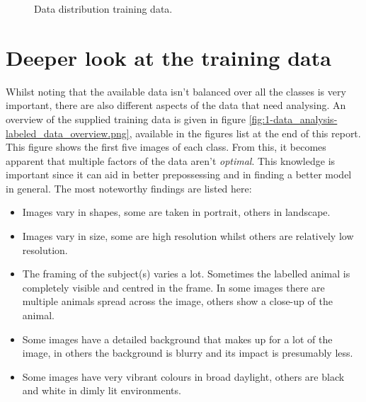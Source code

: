 \begin{figure}[H]
    \centering
    \captionsetup{width=0.6\linewidth}
    \captionsetup{justification=centering}
    \caption{Data distribution training data.}
    \label{fig:1-data_analysis-labeled_data_distribution}
\end{figure}


\section{Deeper look at the training data}
\label{section:DA_deeper_look_data}

Whilst noting that the available data isn't balanced over all the classes is very important, there are also different aspects of the data that need analysing. 
An overview of the supplied training data is given in figure \ref{fig:1-data_analysis-labeled_data_overview.png}, available in the figures list at the end of this report.
This figure shows the first five images of each class.
From this, it becomes apparent that multiple factors of the data aren't \emph{optimal}.
This knowledge is important since it can aid in better prepossessing and in finding a better model in general.
The most noteworthy findings are listed here:
\begin{itemize}
    \item Images vary in shapes, some are taken in portrait, others in landscape.
    \item Images vary in size, some are high resolution whilst others are relatively low resolution.
    \item The framing of the subject(s) varies a lot. Sometimes the labelled animal is completely visible and centred in the frame. In some images there are multiple animals spread across the image, others show a close-up of the animal.
    \item Some images have a detailed background that makes up for a lot of the image, in others the background is blurry and its impact is presumably less.
    \item Some images have very vibrant colours in broad daylight, others are black and white in dimly lit environments.
\end{itemize}

